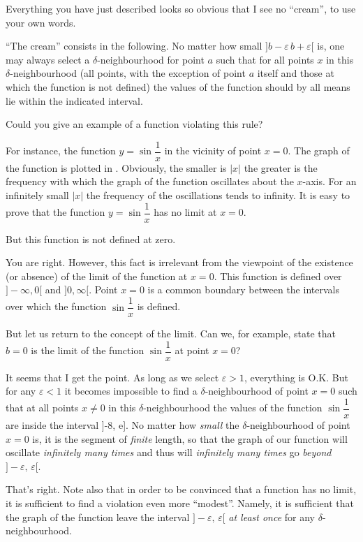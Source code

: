 {\rdr Everything you have just described looks so obvious that I see no ``cream'', to use your own words. 

\athr ``The cream'' consists in the following. No matter how small $]b -\varepsilon 	\, b + \varepsilon [$ is, one may always select a $\delta$-neighbourhood for point $a$ such that for all points $x$ in this $\delta$-neighbourhood (all points, with the exception of point $a$ itself and those at which the function is not defined) the values of the function should by all means lie within the indicated interval.

\rdr Could you give an example of a function violating this rule?

\athr For instance, the function $y = \sin \dfrac{1}{x}$ in the
vicinity of point $x = 0$. The graph of the function is plotted in . Obviously, the smaller is $|x|$ the greater is the frequency with which the graph of the function oscillates about the $x$-axis. For an infinitely small $|x|$ the frequency of the oscillations tends to infinity. It is easy to prove that
the function $y = \sin \dfrac{1}{x}$ has no limit at $x = 0$.

\rdr But this function is not defined at zero.

\athr You are right. However, this fact is irrelevant from the viewpoint of the existence (or absence) of the limit of the function at $x = 0$. This function is defined over $]-\infty, 0[$ and $]0, \infty[$. Point $x = 0$ is a common boundary between the intervals over which the function $\sin \dfrac{1}{x}$ is defined. 

But let us return to the concept of the limit. Can we,
for example, state that $b = 0$ is the limit of the function $\sin \dfrac{1}{x}$ at point $x = 0$?

\rdr It seems that I get the point. As long as we
select $\varepsilon > 1$, everything is O.K. But for any $\varepsilon < 1$ it becomes impossible to find a	$\delta$-neighbourhood of	point $x = 0$ such that at all points $x \neq 0$ in this $\delta$-neighbourhood
the values of the function $\sin \dfrac{1}{x}$  are inside the interval
]-8, e]. No matter how \emph{small} the $\delta$-neighbourhood of point $x = 0$ is, it is the segment of \emph{finite} length, so that the graph of our function will oscillate \emph{infinitely many times} and thus will \emph{infinitely many times} go \emph{beyond} $]-\varepsilon,	\, \varepsilon [$.

\athr That's right. Note also that in order to be convinced that a function has no limit, it is sufficient to find a violation even more ``modest''. Namely, it is sufficient that the graph of the function leave the interval $]-\varepsilon,	\, \varepsilon [$ \emph{at least once} for any $\delta$-neighbourhood.

}
